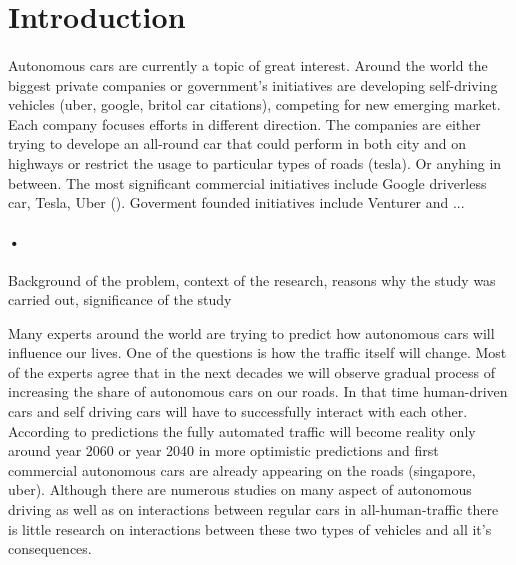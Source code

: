 \documentclass[12pt]{article} %
\begin{document}

\tableofcontents %

\newpage %



\section{Introduction} %
\paragraph{}
Autonomous cars are currently a topic of great interest. Around the world the biggest
private companies or government’s initiatives are developing self-driving vehicles (uber,
google, britol car citations), competing for new emerging market. Each company focuses
efforts in different direction. The companies are either trying to develope an
all-round car that could perform in both city and on highways or restrict the usage to
particular types of roads (tesla). Or anyhing in between. The most significant commercial
initiatives include Google driverless car, Tesla, Uber (). Goverment founded
initiatives include Venturer and ...


\paragraph{•}
Background of the problem, context of the research, reasons why the study was carried
out, significance of the study



Many experts around the world are trying to predict how autonomous cars will influence
our lives. One of the questions is how the traffic itself will change. Most of the
experts agree that in the next decades we will observe gradual process of increasing the
share of autonomous cars on our roads. In that time human-driven cars and self driving
cars will have to successfully interact with each other. According to predictions the
fully automated traffic will become reality only around year 2060 or year 2040 in more
optimistic predictions and first commercial autonomous cars are already appearing on
the roads (singapore, uber). Although there are numerous studies on many aspect of
autonomous driving as well as on interactions between regular cars in all-human-traffic
there is little research on interactions between these two types of vehicles and all it’s
consequences.
\end{document}
